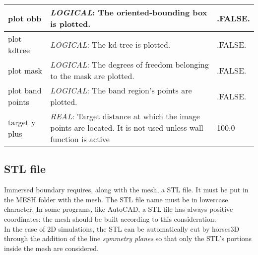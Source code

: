\documentclass[a4paper,10pt]{report}
\begin{document}
\begin{longtable}{|p{4cm}|p{10cm}|p{2.2cm}|}
plot obb & \textit{LOGICAL}: The oriented-bounding box is plotted. & .FALSE. \\ \hline

plot kdtree & \textit{LOGICAL}: The kd-tree is plotted. & .FALSE. \\ \hline

plot mask & \textit{LOGICAL}: The degrees of freedom belonging to the mask are plotted. & .FALSE. \\ \hline

plot band points & \textit{LOGICAL}: The band region's points are plotted. & .FALSE. \\ \hline

target y plus & \textit{REAL}: Target distance at which the image points are located. It is not used unless wall function is active & 100.0 \\ \hline

\end{longtable}


\subsection{STL file}

Immersed boundary requires, along with the mesh, a STL file. It must be put in the MESH folder with the mesh. The STL file name must be in lowercase character. In some programs, like AutoCAD, a STL file has always positive coordinates: the mesh should be built according to this consideration.\\
In the case of 2D simulations, the STL can be automatically cut by horses3D through the addition of the line \textit{symmetry planes} so that only the STL's portions inside the mesh are considered.
\end{document}
